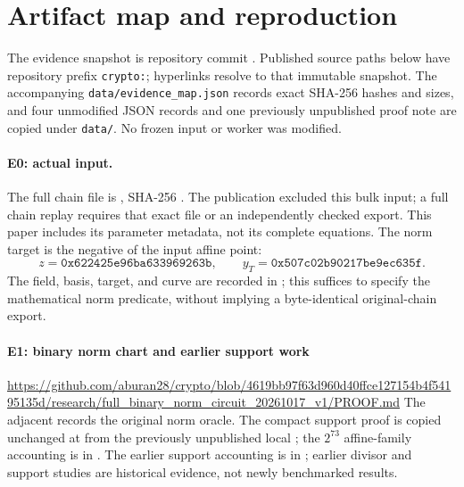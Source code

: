 \section{Artifact map and reproduction}\label{app:artifacts}
\small
The evidence snapshot is repository commit
.
Published source paths below have repository prefix \texttt{crypto:}; hyperlinks resolve to
that immutable snapshot. The accompanying \texttt{data/evidence\_map.json}
records exact SHA-256 hashes and sizes, and four unmodified JSON records and one previously unpublished proof note
are copied under \texttt{data/}. No frozen input or worker was modified.

\newcommand{\artifact}[2]{\paragraph{#1}\url{https://github.com/aburan28/crypto/blob/4619bb97f63d960d40ffce127154b4f54195135d/#2}}
\paragraph{E0: actual input.}
The full chain file is
,
SHA-256
.
The publication excluded this bulk input; a full chain replay requires
that exact file or an independently checked export. This paper includes
its parameter metadata, not its complete equations.
The norm target is the negative of the input affine point:
\[
 z=\mathtt{0x622425e96ba633969263b},\qquad
 y_T=\mathtt{0x507c02b90217be9ec635f}.
\]
The field, basis, target, and curve are recorded in
; this suffices to specify the mathematical
norm predicate, without implying a byte-identical original-chain export.

\artifact{E1: binary norm chart and earlier support work}{research/full_binary_norm_circuit_20261017_v1/PROOF.md}
The adjacent  records the original norm oracle.
The compact support proof is copied unchanged at  from the previously unpublished local ; the $2^{73}$ affine-family accounting is in . The earlier support accounting is in
; earlier divisor
and support studies are historical evidence, not newly benchmarked results.


